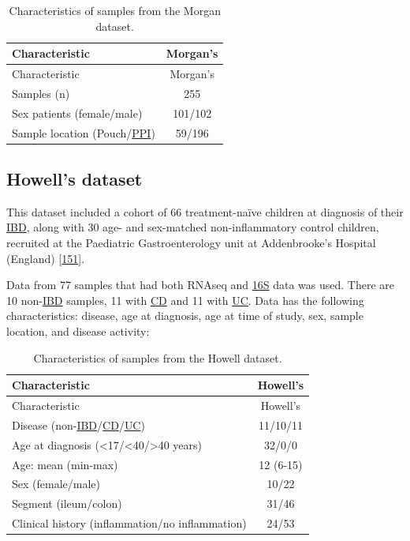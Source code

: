 \documentclass[
  12pt,
  a4paper,
  twoside,
  openright]{book}
\begin{document}
\begin{longtable}[]{@{}lc@{}}
\caption{\label{tab:Morgan} Characteristics of samples from the Morgan dataset.}\tabularnewline
\toprule
Characteristic & Morgan's \\
\midrule
\endfirsthead
\toprule
Characteristic & Morgan's \\
\midrule
\endhead
Samples (n) & 255 \\
Sex patients (female/male) & 101/102 \\
Sample location (Pouch/\protect\hyperlink{acronyms_PPI}{PPI}) & 59/196 \\
\bottomrule
\end{longtable}

\hypertarget{methods-howell}{%
\subsection{Howell's dataset}\label{methods-howell}}

This dataset included a cohort of 66 treatment-naïve children at diagnosis of their \protect\hyperlink{acronyms_IBD}{IBD}, along with 30 age- and sex-matched non-inflammatory control children, recruited at the Paediatric Gastroenterology unit at Addenbrooke's Hospital (England) {[}\protect\hyperlink{ref-howell2018}{151}{]}.

Data from 77 samples that had both RNAseq and \protect\hyperlink{acronyms_16S}{16S} data was used.
There are 10 non-\protect\hyperlink{acronyms_IBD}{IBD} samples, 11 with \protect\hyperlink{acronyms_CD}{CD} and 11 with \protect\hyperlink{acronyms_UC}{UC}.
Data has the following characteristics: disease, age at diagnosis, age at time of study, sex, sample location, and disease activity:

\begin{longtable}[]{@{}lc@{}}
\caption{\label{tab:howell} Characteristics of samples from the Howell dataset.}\tabularnewline
\toprule
Characteristic & Howell's \\
\midrule
\endfirsthead
\toprule
Characteristic & Howell's \\
\midrule
\endhead
Disease (non-\protect\hyperlink{acronyms_IBD}{IBD}/\protect\hyperlink{acronyms_CD}{CD}/\protect\hyperlink{acronyms_UC}{UC}) & 11/10/11 \\
Age at diagnosis (\textless17/\textless40/\textgreater40 years) & 32/0/0 \\
Age: mean (min-max) & 12 (6-15) \\
Sex (female/male) & 10/22 \\
Segment (ileum/colon) & 31/46 \\
Clinical history (inflammation/no inflammation) & 24/53 \\
\bottomrule
\end{longtable}
\end{document}

